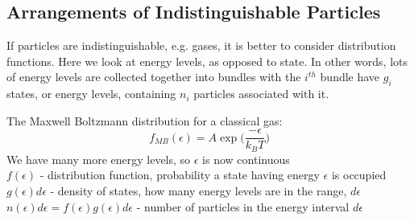 \documentclass[a4paper, 11pt, normalem]{report}
\begin{document}
\subsection{Arrangements of Indistinguishable Particles}
If particles are indistinguishable, e.g. gases, it is better to consider distribution functions.
Here we look at energy levels, as opposed to state.
In other words, lots of energy levels are collected together into bundles with the $i^{th}$ bundle have $g_i$ states, or energy levels, containing $n_i$ particles associated with it.

The Maxwell Boltzmann distribution for a classical gas:
\begin{equation*}
    f_{MB}(\epsilon) = A\exp\Big(\frac{-\epsilon}{k_B T}\Big)
\end{equation*}
We have many more energy levels, so $\epsilon$ is now continuous \\
$f(\epsilon)$ - distribution function, probability a state having energy $\epsilon$ is occupied \\
$g(\epsilon)d\epsilon$ - density of states, how many energy levels are in the range, $d\epsilon$ \\
$n(\epsilon)d\epsilon = f(\epsilon)g(\epsilon)d\epsilon$ - number of particles in the energy interval $d\epsilon$
\end{document}
